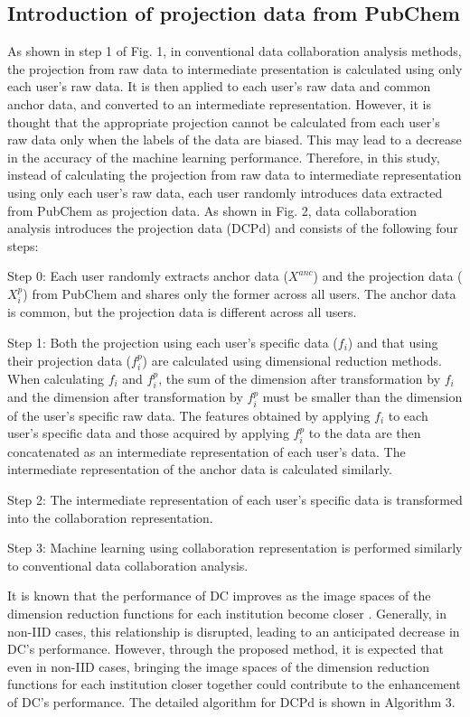 \documentclass{article}
\begin{document}
\subsection{Introduction of projection data from PubChem}
\label{sec:sample1}
As shown in step 1 of Fig. 1, in conventional data collaboration analysis methods, the projection from raw data to intermediate presentation is calculated using only each user's raw data. It is then applied to each user's raw data and common anchor data, and converted to an intermediate representation. However, it is thought that the appropriate projection cannot be calculated from each user's raw data only when the labels of the data are biased. This may lead to a decrease in the accuracy of the machine learning performance. Therefore, in this study, instead of calculating the projection from raw data to intermediate representation using only each user's raw data, each user randomly introduces data extracted from PubChem as projection data. As shown in Fig. 2, data collaboration analysis introduces the projection data (DCPd) and consists of the following four steps: 

Step 0: Each user randomly extracts anchor data ($X^{anc}$) and the projection data ($X^{p}_{i}$) from PubChem and shares only the former across all users. The anchor data is common, but the projection data is different across all users.

Step 1: Both the projection using each user's specific data ($f_{i}$) and that using their projection data ($f^{p}_{i}$) are calculated using dimensional reduction methods. When calculating $f_{i}$ and $f^{p}_{i}$, the sum of the dimension after transformation by $f_{i}$ and the dimension after transformation by $f^{p}_{i}$ must be smaller than the dimension of the user's specific raw data.
The features obtained by applying $f_{i}$ to each user's specific data and those acquired by applying $f^{p}_{i}$ to the data are then concatenated as an intermediate representation of each user's data. The intermediate representation of the anchor data is calculated similarly.

Step 2: The intermediate representation of each user's specific data is transformed into the collaboration representation.

Step 3: Machine learning using collaboration representation is performed similarly to conventional data collaboration analysis.

It is known that the performance of DC improves as the image spaces of the dimension reduction functions for each institution become closer \cite{imakura2021accuracy}. Generally, in non-IID cases, this relationship is disrupted, leading to an anticipated decrease in DC's performance. However, through the proposed method, it is expected that even in non-IID cases, bringing the image spaces of the dimension reduction functions for each institution closer together could contribute to the enhancement of DC's performance. The detailed algorithm for DCPd is shown in Algorithm 3.
\end{document}

